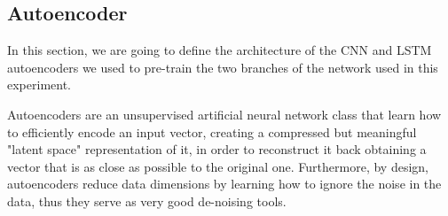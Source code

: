 \subsection{Autoencoder}

In this section, we are going to define the architecture of the CNN and LSTM autoencoders we used to pre-train the two branches of the network used in this experiment.

Autoencoders are an unsupervised artificial neural network class that learn how to efficiently encode an input vector, creating a compressed but meaningful "latent space" representation of it, in order to reconstruct it back obtaining a vector that is as close as possible to the original one. Furthermore, by design, autoencoders reduce data dimensions by learning how to ignore the noise in the data, thus they serve as very good de-noising tools.

